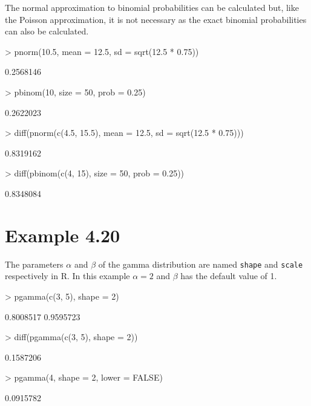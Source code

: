 \documentclass{book}
\begin{document}
The normal approximation to binomial probabilities can be calculated
but, like the Poisson approximation, it is not necessary as the exact
binomial probabilities can also be calculated.
\begin{Schunk}
\begin{Sinput}
> pnorm(10.5, mean = 12.5, sd = sqrt(12.5 * 0.75))
\end{Sinput}
\begin{Soutput}
[1] 0.2568146
\end{Soutput}
\begin{Sinput}
> pbinom(10, size = 50, prob = 0.25)
\end{Sinput}
\begin{Soutput}
[1] 0.2622023
\end{Soutput}
\begin{Sinput}
> diff(pnorm(c(4.5, 15.5), mean = 12.5, sd = sqrt(12.5 * 0.75)))
\end{Sinput}
\begin{Soutput}
[1] 0.8319162
\end{Soutput}
\begin{Sinput}
> diff(pbinom(c(4, 15), size = 50, prob = 0.25))
\end{Sinput}
\begin{Soutput}
[1] 0.8348084
\end{Soutput}
\end{Schunk}


\section{Example 4.20}
\label{sec:xmp0420}

The parameters $\alpha$ and $\beta$ of the gamma distribution are named
\texttt{shape} and \texttt{scale} respectively in R.
In this example $\alpha=2$ and $\beta$ has the default value of 1.
\begin{Schunk}
\begin{Sinput}
> pgamma(c(3, 5), shape = 2)
\end{Sinput}
\begin{Soutput}
[1] 0.8008517 0.9595723
\end{Soutput}
\begin{Sinput}
> diff(pgamma(c(3, 5), shape = 2))
\end{Sinput}
\begin{Soutput}
[1] 0.1587206
\end{Soutput}
\begin{Sinput}
> pgamma(4, shape = 2, lower = FALSE)
\end{Sinput}
\begin{Soutput}
[1] 0.0915782
\end{Soutput}
\end{Schunk}
\end{document}
